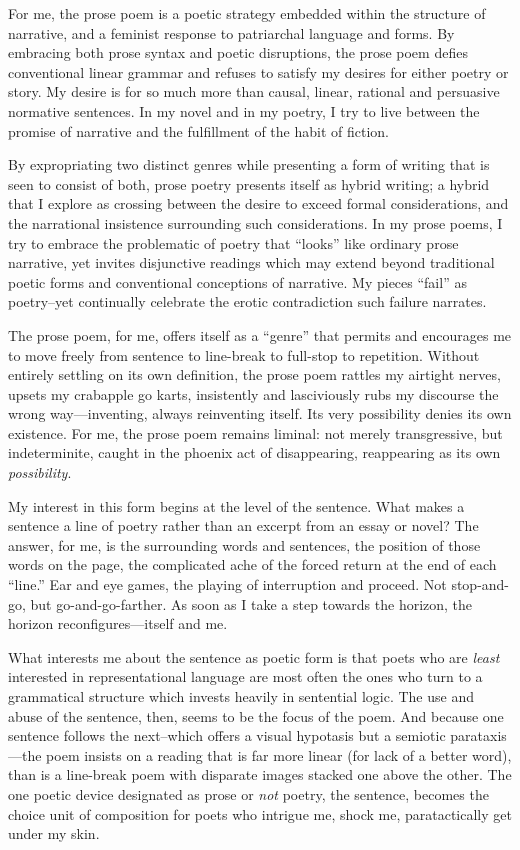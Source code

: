 \documentclass[
]{memoir}
\begin{document}
For me, the prose poem is a poetic strategy embedded within the
structure of narrative, and a feminist response to patriarchal language
and forms. By embracing both prose syntax and poetic disruptions, the
prose poem defies conventional linear grammar and refuses to satisfy my
desires for either poetry or story. My desire is for so much more than
causal, linear, rational and persuasive normative sentences. In my novel
and in my poetry, I try to live between the promise of narrative and the
fulfillment of the habit of fiction.

By expropriating two distinct genres while presenting a form of writing
that is seen to consist of both, prose poetry presents itself as hybrid
writing; a hybrid that I explore as crossing between the desire to
exceed formal considerations, and the narrational insistence surrounding
such considerations. In my prose poems, I try to embrace the problematic
of poetry that ``looks'' like ordinary prose narrative, yet invites
disjunctive readings which may extend beyond traditional poetic forms
and conventional conceptions of narrative. My pieces ``fail'' as
poetry--yet continually celebrate the erotic contradiction such failure
narrates.

The prose poem, for me, offers itself as a ``genre'' that permits and
encourages me to move freely from sentence to line-break to full-stop to
repetition. Without entirely settling on its own definition, the prose
poem rattles my airtight nerves, upsets my crabapple go karts,
insistently and lasciviously rubs my discourse the wrong
way---inventing, always reinventing itself. Its very possibility denies
its own existence. For me, the prose poem remains liminal: not merely
transgressive, but indeterminite, caught in the phoenix act of
disappearing, reappearing as its own \emph{possibility}.

My interest in this form begins at the level of the sentence. What makes
a sentence a line of poetry rather than an excerpt from an essay or
novel? The answer, for me, is the surrounding words and sentences, the
position of those words on the page, the complicated ache of the forced
return at the end of each ``line.'' Ear and eye games, the playing of
interruption and proceed. Not stop-and-go, but go-and-go-farther. As
soon as I take a step towards the horizon, the horizon
reconfigures---itself and me.

What interests me about the sentence as poetic form is that poets who
are \emph{least} interested in representational language are most often
the ones who turn to a grammatical structure which invests heavily in
sentential logic. The use and abuse of the sentence, then, seems to be
the focus of the poem. And because one sentence follows the next--which
offers a visual hypotasis but a semiotic parataxis---the poem insists on
a reading that is far more linear (for lack of a better word), than is a
line-break poem with disparate images stacked one above the other. The
one poetic device designated as prose or \emph{not} poetry, the
sentence, becomes the choice unit of composition for poets who intrigue
me, shock me, paratactically get under my skin.
\end{document}

